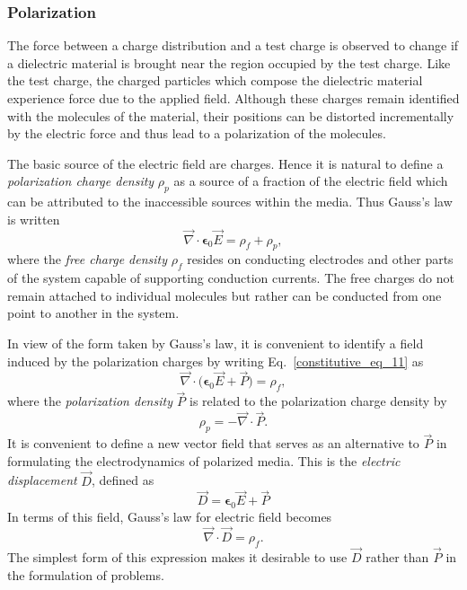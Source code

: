 \documentclass[12pt,a4paper,oneside]{book}
\begin{document}
\begin{onehalfspace}
\subsubsection{Polarization}
The force between a charge distribution and a test charge is observed to change if a dielectric material is brought near the region occupied by the test charge. Like the test charge, the charged particles which compose the dielectric material experience force due to the applied field. Although these charges remain identified with the molecules of the material, their positions can be distorted incrementally by the electric force and thus lead to a polarization of the molecules.

The basic source of the electric field are charges. Hence it is natural to define a \textit{polarization charge density} $\rho_{p}$ as a source of a fraction of the electric field which can be attributed to the inaccessible sources within the media. Thus Gauss's law is written
 \begin{equation}\label{constitutive_eq_10}
 	\vec{\nabla}\cdot\mathbf{\epsilon}_0\vec{E}=\rho_f+\rho_p,
 \end{equation}
where the \textit{free charge density} $\rho_f$ resides on conducting electrodes and other parts of the system capable of supporting conduction currents. The free charges do not remain attached to individual molecules but rather can be conducted from one point to another in the system.

In view of the form taken by Gauss's law, it is convenient to identify a field induced by the polarization charges by writing Eq.~\eqref{constitutive_eq_11} as 
 \begin{equation}\label{constitutive_eq_11}
	\vec{\nabla}\cdot\big(\mathbf{\epsilon}_0\vec{E}+\vec{P}\big)=\rho_f,
\end{equation}
where the \textit{polarization density} $\vec{P}$ is related to the polarization charge density by
 \begin{equation}\label{constitutive_eq_12}
	\rho_{p}=-\vec{\nabla}\cdot\vec{P}.
\end{equation} 
It is convenient to define a new vector field that serves as an alternative to $\vec{P}$ in formulating the electrodynamics of polarized media. This is the \textit{electric displacement} $\vec{D}$, defined as
 \begin{equation}\label{constitutive_eq_13}
	\vec{D}=\mathbf{\epsilon}_0\vec{E}+\vec{P}
\end{equation}
In terms of this field, Gauss's law for electric field becomes
 \begin{equation}\label{constitutive_eq_14}
	\vec{\nabla}\cdot\vec{D}=\rho_f.
 \end{equation}
The simplest form of this expression makes it desirable to use $\vec{D}$ rather than $\vec{P}$ in the formulation of problems.


\end{onehalfspace}
\end{document}
